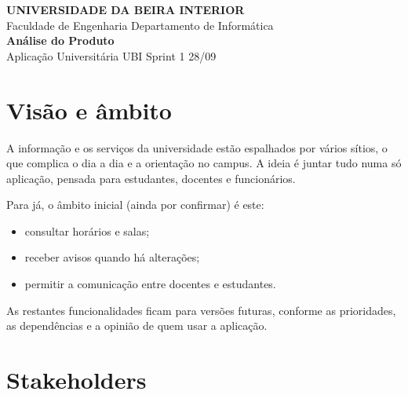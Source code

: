\documentclass[11pt,a4paper]{article}
\begin{document}
\thispagestyle{primeira}

\begin{tcolorbox}[colback=azul, colframe=azul, coltext=white, arc=3pt, boxrule=0pt,
    left=16pt, right=16pt, top=14pt, bottom=14pt]
  \sffamily
  {\footnotesize\bfseries\MakeUppercase{Universidade da Beira Interior}}\\[2pt]
  {\footnotesize Faculdade de Engenharia \textperiodcentered{} Departamento de Informática}\\[16pt]
  {\fontsize{28}{32}\selectfont\bfseries Análise do Produto}\\[4pt]
  {\large Aplicação Universitária UBI \textperiodcentered{} Sprint 1 \textperiodcentered{} 28/09}
\end{tcolorbox}

\section{Visão e âmbito}

A informação e os serviços da universidade estão espalhados por vários sítios, o que complica o dia a dia e a orientação no campus. A ideia é juntar tudo numa só aplicação, pensada para estudantes, docentes e funcionários.

Para já, o âmbito inicial (ainda por confirmar) é este:

\begin{itemize}
  \item consultar horários e salas;
  \item receber avisos quando há alterações;
  \item permitir a comunicação entre docentes e estudantes.
\end{itemize}

As restantes funcionalidades ficam para versões futuras, conforme as prioridades, as dependências e a opinião de quem usar a aplicação.

\section{Stakeholders}
\end{document}
